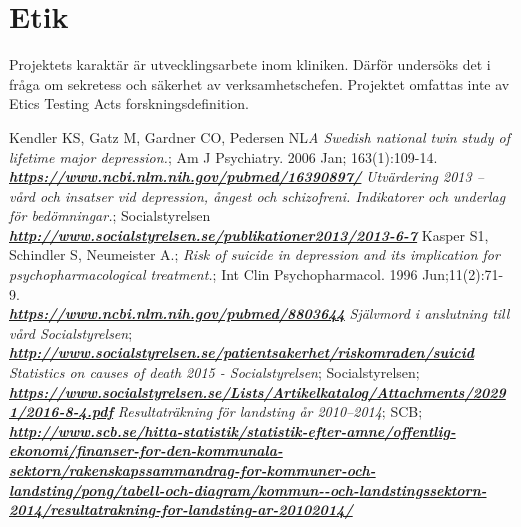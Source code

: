 \documentclass[12pt,a4paper,oneside]{article}
\begin{document}
\section*{Etik}
Projektets karakt{\"a}r {\"a}r utvecklingsarbete inom kliniken. D{\"a}rf{\"o}r unders{\"o}ks det i fr{\aa}ga om sekretess och s{\"a}kerhet av verksamhetschefen. Projektet omfattas inte av Etics Testing Acts forskningsdefinition.

\begin{thebibliography}{11}
Kendler KS, Gatz M, Gardner CO, Pedersen NL\emph{A Swedish national twin study of lifetime major depression.}; Am J Psychiatry. 2006 Jan; 163(1):109-14.\\\textbf{\emph{\href{https://www.ncbi.nlm.nih.gov/pubmed/16390897/}{\url{https://www.ncbi.nlm.nih.gov/pubmed/16390897/}}}}
 \emph{Utv{\"a}rdering 2013 -- v\r{a}rd och insatser vid depression, \r{a}ngest och schizofreni. Indikatorer och underlag f{\"o}r bed{\"o}mningar.}; Socialstyrelsen\\\textbf{\emph{\href{http://www.socialstyrelsen.se/publikationer2013/2013-6-7}{\url{http://www.socialstyrelsen.se/publikationer2013/2013-6-7}}}}
 Kasper S1, Schindler S, Neumeister A.; \emph{Risk of suicide in depression and its implication for psychopharmacological treatment.}; Int Clin Psychopharmacol. 1996 Jun;11(2):71-9.\\\textbf{\emph{\href{https://www.ncbi.nlm.nih.gov/pubmed/8803644}{\url{https://www.ncbi.nlm.nih.gov/pubmed/8803644}}}}
 \emph{Sj{\"a}lvmord i anslutning till v\r{a}rd Socialstyrelsen};\\\textbf{\emph{\href{http://www.socialstyrelsen.se/patientsakerhet/riskomraden/suicid}{\url{http://www.socialstyrelsen.se/patientsakerhet/riskomraden/suicid
}}}}
\emph{Statistics on causes of death 2015 - Socialstyrelsen}; Socialstyrelsen;
\\\textbf{\emph{\href{https://www.socialstyrelsen.se/Lists/Artikelkatalog/Attachments/20291/2016-8-4.pdf}{\url{
https://www.socialstyrelsen.se/Lists/Artikelkatalog/Attachments/20291/2016-8-4.pdf}}}}
 \emph{Resultatr{\"a}kning f{\"o}r landsting \r{a}r 2010--2014}; SCB;\\\textbf{\emph{\href{ http://www.scb.se/hitta-statistik/statistik-efter-amne/offentlig-ekonomi/finanser-for-den-kommunala-sektorn/rakenskapssammandrag-for-kommuner-och-landsting/pong/tabell-och-diagram/kommun--och-landstingssektorn-2014/resultatrakning-for-landsting-ar-20102014/}{\url{http://www.scb.se/hitta-statistik/statistik-efter-amne/offentlig-ekonomi/finanser-for-den-kommunala-sektorn/rakenskapssammandrag-for-kommuner-och-landsting/pong/tabell-och-diagram/kommun--och-landstingssektorn-2014/resultatrakning-for-landsting-ar-20102014/}}}}

\end{thebibliography}
\end{document}
